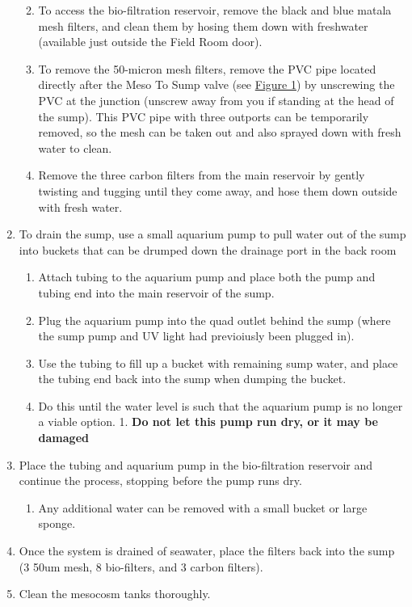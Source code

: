 \documentclass[
]{book}
\providecommand{\tightlist}{%
  \setlength{\itemsep}{0pt}\setlength{\parskip}{0pt}}
\begin{document}
\begin{enumerate}
  \begin{enumerate}
  \def\labelenumii{\arabic{enumii}.}
  \tightlist
  \item
    To access the bio-filtration reservoir, remove the black and blue matala mesh filters, and clean them by hosing them down with freshwater (available just outside the Field Room door).
  \item
    To remove the 50-micron mesh filters, remove the PVC pipe located directly after the Meso To Sump valve (see \protect\hyperlink{Figure1}{Figure 1}) by unscrewing the PVC at the junction (unscrew away from you if standing at the head of the sump). This PVC pipe with three outports can be temporarily removed, so the mesh can be taken out and also sprayed down with fresh water to clean.
  \item
    Remove the three carbon filters from the main reservoir by gently twisting and tugging until they come away, and hose them down outside with fresh water.
  \end{enumerate}
\item
  To drain the sump, use a small aquarium pump to pull water out of the sump into buckets that can be drumped down the drainage port in the back room

  \begin{enumerate}
  \def\labelenumii{\arabic{enumii}.}
  \tightlist
  \item
    Attach tubing to the aquarium pump and place both the pump and tubing end into the main reservoir of the sump.
  \item
    Plug the aquarium pump into the quad outlet behind the sump (where the sump pump and UV light had previoiusly been plugged in).
  \item
    Use the tubing to fill up a bucket with remaining sump water, and place the tubing end back into the sump when dumping the bucket.
  \item
    Do this until the water level is such that the aquarium pump is no longer a viable option. 1. \textbf{Do not let this pump run dry, or it may be damaged}
  \end{enumerate}
\item
  Place the tubing and aquarium pump in the bio-filtration reservoir and continue the process, stopping before the pump runs dry.

  \begin{enumerate}
  \def\labelenumii{\arabic{enumii}.}
  \tightlist
  \item
    Any additional water can be removed with a small bucket or large sponge.
  \end{enumerate}
\item
  Once the system is drained of seawater, place the filters back into the sump (3 50um mesh, 8 bio-filters, and 3 carbon filters).
\item
  Clean the mesocosm tanks thoroughly.


\end{enumerate}
\end{document}

